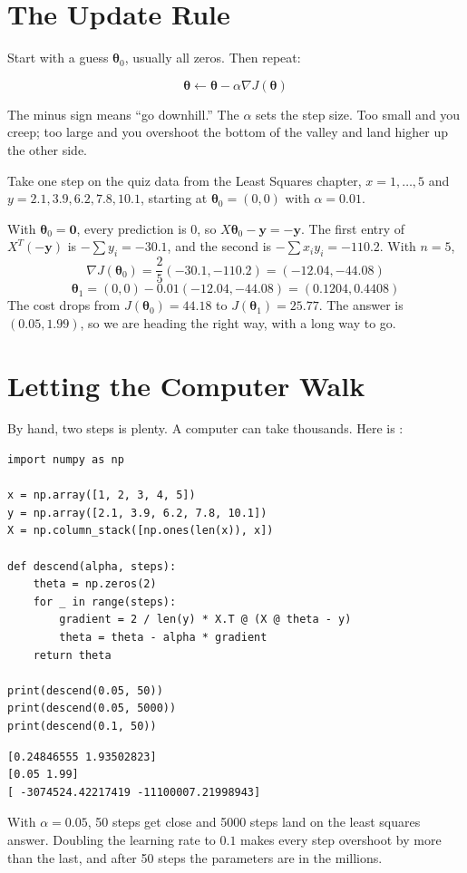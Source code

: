\section{The Update Rule}
Start with a guess $\boldsymbol{\theta}_0$, usually all zeros. Then repeat:
\begin{mdframed}[style=important]
$$\boldsymbol{\theta} \leftarrow \boldsymbol{\theta} - \alpha \nabla J(\boldsymbol{\theta})$$
\end{mdframed}
The minus sign means ``go downhill.'' The  $\alpha$ sets the step size. Too small and
you creep; too large and you overshoot the bottom of the valley and land higher up the other side.

\begin{Worked}
\begin{Problem}
Take one step on the quiz data from the Least Squares chapter, $x = 1, \ldots, 5$ and
$y = 2.1, 3.9, 6.2, 7.8, 10.1$, starting at $\boldsymbol{\theta}_0 = (0, 0)$ with $\alpha = 0.01$.
\end{Problem}
\begin{Solution}
With $\boldsymbol{\theta}_0 = \mathbf{0}$, every prediction is 0, so
$X\boldsymbol{\theta}_0 - \mathbf{y} = -\mathbf{y}$. The first entry of $X^T(-\mathbf{y})$ is $-\sum y_i = -30.1$,
and the second is $-\sum x_i y_i = -110.2$. With $n = 5$,
$$\nabla J(\boldsymbol{\theta}_0) = \frac{2}{5}(-30.1, -110.2) = (-12.04, -44.08)$$
$$\boldsymbol{\theta}_1 = (0, 0) - 0.01(-12.04, -44.08) = (0.1204, 0.4408)$$
The cost drops from $J(\boldsymbol{\theta}_0) = 44.18$ to $J(\boldsymbol{\theta}_1) = 25.77$. The answer
is $(0.05, 1.99)$, so we are heading the right way, with a long way to go.
\end{Solution}
\end{Worked}

\section{Letting the Computer Walk}
By hand, two steps is plenty. A computer can take thousands. Here is :
\begin{verbatim}
import numpy as np

x = np.array([1, 2, 3, 4, 5])
y = np.array([2.1, 3.9, 6.2, 7.8, 10.1])
X = np.column_stack([np.ones(len(x)), x])

def descend(alpha, steps):
    theta = np.zeros(2)
    for _ in range(steps):
        gradient = 2 / len(y) * X.T @ (X @ theta - y)
        theta = theta - alpha * gradient
    return theta

print(descend(0.05, 50))
print(descend(0.05, 5000))
print(descend(0.1, 50))
\end{verbatim}
\begin{verbatim}
[0.24846555 1.93502823]
[0.05 1.99]
[ -3074524.42217419 -11100007.21998943]
\end{verbatim}
With $\alpha = 0.05$, 50 steps get close and 5000 steps land on the least squares answer. Doubling the learning
rate to $0.1$ makes every step overshoot by more than the last, and after 50 steps the parameters are in the
millions.

